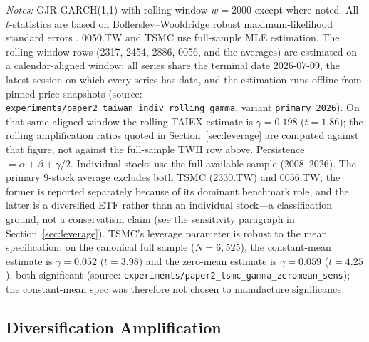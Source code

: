 \begin{table}[H]
\begin{flushleft}
\small \textit{Notes:} GJR-GARCH(1,1) with rolling window $w = 2000$ except where noted. All $t$-statistics are based on Bollerslev--Wooldridge robust maximum-likelihood standard errors \citep{bollerslev1992}. 0050.TW and TSMC use full-sample MLE estimation. The rolling-window rows (2317, 2454, 2886, 0056, and the averages) are estimated on a calendar-aligned window: all series share the terminal date 2026-07-09, the latest session on which every series has data, and the estimation runs offline from pinned price snapshots (source: \texttt{experiments/paper2\_taiwan\_indiv\_rolling\_gamma}, variant \texttt{primary\_2026}). On that same aligned window the rolling TAIEX estimate is $\gamma = 0.198$ ($t = 1.86$); the rolling amplification ratios quoted in Section~\ref{sec:leverage} are computed against that figure, not against the full-sample TWII row above. Persistence $= \alpha + \beta + \gamma/2$. Individual stocks use the full available sample (2008--2026). The primary 9-stock average excludes both TSMC (2330.TW) and 0056.TW; the former is reported separately because of its dominant benchmark role, and the latter is a diversified ETF rather than an individual stock---a classification ground, not a conservatism claim (see the sensitivity paragraph in Section~\ref{sec:leverage}). TSMC's leverage parameter is robust to the mean specification: on the canonical full sample ($N=6{,}525$), the constant-mean estimate is $\gamma = 0.052$ ($t = 3.98$) and the zero-mean estimate is $\gamma = 0.059$ ($t = 4.25$), both significant (source: \texttt{experiments/paper2\_tsmc\_gamma\_zeromean\_sens}); the constant-mean spec was therefore not chosen to manufacture significance.
\end{flushleft}
\end{table}

\subsection{Diversification Amplification}

